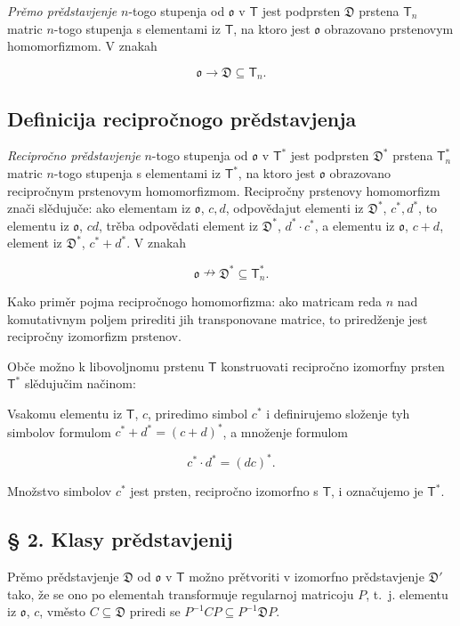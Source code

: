 \documentclass[11pt]{article}
\begin{document}
\emph{Prěmo prědstavjenje} \(n\)-togo stupenja od \(\mathfrak{o}\) v \(\mathsf T\) jest podprsten \(\mathfrak D\) prstena \(\mathsf T_n\) matric \(n\)-togo stupenja s elementami iz \(\mathsf T\), na ktoro jest \(\mathfrak{o}\) obrazovano prstenovym homomorfizmom. V znakah

\[
\mathfrak{o}\to\mathfrak D\subseteq\mathsf T_n.
\]

\subsection*{Definicija recipročnogo prědstavjenja}\label{definition-der-reziproken-darstellung}

\emph{Recipročno prědstavjenje} \(n\)-togo stupenja od \(\mathfrak{o}\) v \(\mathsf T^*\) jest podprsten \(\mathfrak D^*\) prstena \(\mathsf T_n^*\) matric \(n\)-togo stupenja s elementami iz \(\mathsf T^*\), na ktoro jest \(\mathfrak{o}\) obrazovano recipročnym prstenovym homomorfizmom. Recipročny prstenovy homomorfizm znači slědujuče: ako elementam iz \(\mathfrak{o}\), \(c,d\), odpovědajut elementi iz \(\mathfrak D^*\), \(c^*,d^*\), to elementu iz \(\mathfrak{o}\), \(cd\), trěba odpovědati element iz \(\mathfrak D^*\), \(d^*\cdot c^*\), a elementu iz \(\mathfrak{o}\), \(c+d\), element iz \(\mathfrak D^*\), \(c^*+d^*\). V znakah

\[
\mathfrak{o}\nrightarrow\mathfrak D^*\subseteq\mathsf T_n^*.
\]

Kako priměr pojma recipročnogo homomorfizma: ako matricam reda \(n\) nad komutativnym poljem prirediti jih transponovane matrice, to priredženje jest recipročny izomorfizm prstenov.

Obče možno k libovoljnomu prstenu \(\mathsf T\) konstruovati recipročno izomorfny prsten \(\mathsf T^*\) slědujučim načinom:

Vsakomu elementu iz \(\mathsf T\), \(c\), priredimo simbol \(c^*\) i definirujemo složenje tyh simbolov formulom \(c^*+d^*=(c+d)^*\), a množenje formulom

\[
c^*\cdot d^*=(dc)^*.
\]

Množstvo simbolov \(c^*\) jest prsten, recipročno izomorfno s \(\mathsf T\), i označujemo je \(\mathsf T^*\).

\subsection*{§ 2. Klasy prědstavjenij}\label{darstellungsklassen}

Prěmo prědstavjenje \(\mathfrak D\) od \(\mathfrak{o}\) v \(\mathsf T\) možno prětvoriti v izomorfno prědstavjenje \(\mathfrak D'\) tako, že se ono po elementah transformuje regularnoj matricoju \(P\), t.~j. elementu iz \(\mathfrak{o}\), \(c\), vměsto \(C\subseteq\mathfrak D\) priredi se \(P^{-1}CP\subseteq P^{-1}\mathfrak D P\).
\end{document}
